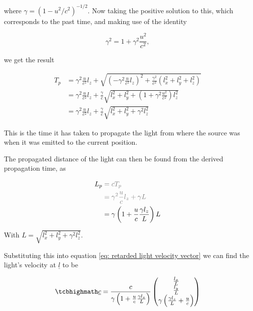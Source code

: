\begin{derivation}
	where $\gamma = (1 - u^2/c^2)^{-1/2}$.
	Now taking the positive solution to this, which corresponds to the past time, and making use of the identity

	\begin{equation}
		\gamma^2 = 1+\gamma^2\frac{u^2}{c^2},
	\end{equation}

	we get the result

	\begin{equation}
		\begin{aligned}
			T_p & = \gamma^2\frac{u}{c^2} l_{z} + \sqrt{\left(-\gamma^2\frac{u}{c^2} l_{z} \right)^2+\frac{\gamma^2}{c^2}(l_{x}^2 + l_{y}^2+ l_{z}^2)} \\
			    & = \gamma^2\frac{u}{c^2} l_{z} + \frac{\gamma}{c}\sqrt{l_{x}^2+ l_{y}^2+\left(1+\gamma^2\frac{u^2}{c^2}\right) l_{z}^2}               \\
			    & = \gamma^2\frac{u}{c^2} l_{z} + \frac{\gamma}{c}\sqrt{l_{x}^2 + l_{y}^2+\gamma^2 l_{z}^2}
		\end{aligned}
	\end{equation}

	This is the time it has taken to propagate the light from where the source was when it was emitted to the current position.

\end{derivation}

The propagated distance of the light can then be found from the derived propagation time, as

\begin{equation}
	\label{eq: propagation distance}
	\begin{aligned}
		L_{p} & \color{gray} = c T_p                                             \\
		      & \color{gray} = \gamma^2 \frac{u}{c} l_{z} + \gamma  L            \\
		      & = \gamma \left( 1 + \frac{u}{c} \frac{\gamma l_{z}}{L} \right) L
	\end{aligned}
\end{equation}

With $ L=\sqrt{l_{x}^2+l_{y}^2+\gamma^2 l_{z}^2}$.

Substituting this into equation \eqref{eq: retarded light velocity vector} we can find the light's velocity at $\underline{l}$ to be

\begin{equation}
	\label{eq: direction of light from moving source}
	\mhl{
		\underline{c} =
		\frac{c}{ \gamma \left( 1 + \frac{u}{c} \frac{\gamma l_{z}}{L} \right) }
		\begin{pmatrix}
			\frac{l_{x}}{L} \\
			\frac{l_{y}}{L} \\
			\gamma \left( \frac{\gamma l_{z}}{L} + \frac{u}{c} \right)
		\end{pmatrix}
	}
\end{equation}

